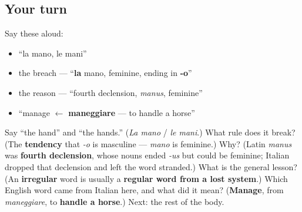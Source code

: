 \subsection*{Your turn}
Say these aloud:

\begin{itemize}
\raggedright
  \item \textquotedblleft{}la mano, le mani\textquotedblright{}
  \item the breach — \textquotedblleft{}\textbf{la} mano, feminine, ending in \textbf{-o}\textquotedblright{}
  \item the reason — \textquotedblleft{}fourth declension, \emph{manus}, feminine\textquotedblright{}
  \item \textquotedblleft{}manage $\leftarrow$ \textbf{maneggiare} — to handle a horse\textquotedblright{}
\end{itemize}

\begin{tcolorbox}[breakable,colback=teal!4,colframe=teal!35!black,title={Before you move on}]
Say \textquotedblleft{}the hand\textquotedblright{} and \textquotedblleft{}the hands.\textquotedblright{} (\emph{La mano} / \emph{le mani}.) What rule does it break? (The \textbf{tendency} that \emph{-o} is masculine — \emph{mano} is feminine.) Why? (Latin \emph{manus} was \textbf{fourth declension}, whose nouns ended \emph{-us} but could be feminine; Italian dropped that declension and left the word stranded.) What is the general lesson? (An \textbf{irregular} word is usually a \textbf{regular word from a lost system}.) Which English word came from Italian here, and what did it mean? (\textbf{Manage}, from \emph{maneggiare}, to \textbf{handle a horse}.) Next: the rest of the body.
\end{tcolorbox}
